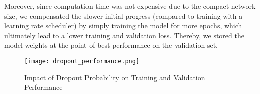Moreover, since computation time was not expensive due to the compact network size, we compensated the slower initial progress (compared to training with a learning rate scheduler) by simply training the model for more epochs, which ultimately lead to a lower training and validation loss.
Thereby, we stored the model weights at the point of best performance on the validation set.

\begin{figure}[ht]
  \centering
  \texttt{[image: dropout\_performance.png]}
  \caption{Impact of Dropout Probability on Training and Validation Performance}
  \label{fig:dropout}
\end{figure}
